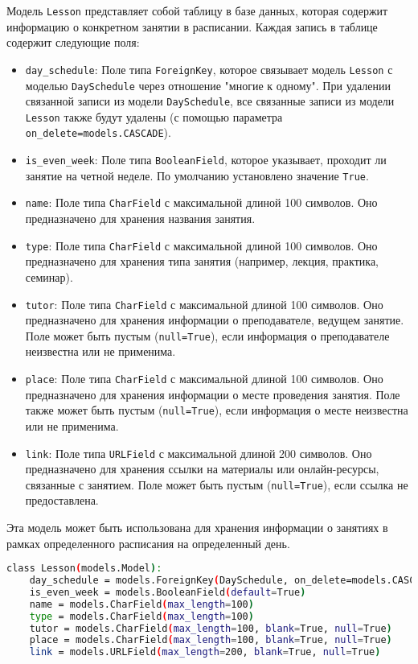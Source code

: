 Модель \texttt{Lesson} представляет собой таблицу в базе данных,
которая содержит информацию о конкретном занятии в расписании.
Каждая запись в таблице содержит следующие поля:

\begin{itemize}
    \item \texttt{day\_schedule}: Поле типа \texttt{ForeignKey},
		которое связывает модель \texttt{Lesson}
		с моделью \texttt{DaySchedule} через отношение "многие к одному".
		При удалении связанной записи из модели \texttt{DaySchedule},
		все связанные записи из модели \texttt{Lesson} также будут удалены
		(с помощью параметра \texttt{on\_delete=models.CASCADE}).
    \item \texttt{is\_even\_week}: Поле типа \texttt{BooleanField},
		которое указывает, проходит ли занятие на четной неделе.
		По умолчанию установлено значение \texttt{True}.
    \item \texttt{name}: Поле типа \texttt{CharField}
		с максимальной длиной 100 символов.
		Оно предназначено для хранения названия занятия.
    \item \texttt{type}: Поле типа \texttt{CharField}
		с максимальной длиной 100 символов.
		Оно предназначено для хранения типа занятия
		(например, лекция, практика, семинар).
    \item \texttt{tutor}: Поле типа \texttt{CharField}
		с максимальной длиной 100 символов.
		Оно предназначено для хранения информации о преподавателе,
		ведущем занятие. Поле может быть пустым (\texttt{null=True}),
		если информация о преподавателе неизвестна или не применима.
    \item \texttt{place}: Поле типа \texttt{CharField}
		с максимальной длиной 100 символов.
		Оно предназначено для хранения информации о месте проведения занятия.
		Поле также может быть пустым (\texttt{null=True}),
		если информация о месте неизвестна или не применима.
    \item \texttt{link}: Поле типа \texttt{URLField}
		с максимальной длиной 200 символов.
		Оно предназначено для хранения ссылки на материалы или онлайн-ресурсы,
		связанные с занятием. Поле может быть пустым (\texttt{null=True}),
		если ссылка не предоставлена.
\end{itemize}

Эта модель может быть использована для хранения информации о занятиях
в рамках определенного расписания на определенный день.

\begin{lstlisting}[language=bash]
class Lesson(models.Model):
    day_schedule = models.ForeignKey(DaySchedule, on_delete=models.CASCADE)
    is_even_week = models.BooleanField(default=True)
    name = models.CharField(max_length=100)
    type = models.CharField(max_length=100)
    tutor = models.CharField(max_length=100, blank=True, null=True)
    place = models.CharField(max_length=100, blank=True, null=True)
    link = models.URLField(max_length=200, blank=True, null=True)
\end{lstlisting}

